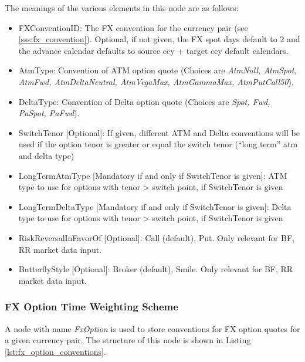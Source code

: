  
The meanings of the various elements in this node are as follows: 
\begin{itemize}
\item FXConventionID: The FX convention for the currency pair (see \ref{sss:fx_convention}). Optional, if not given, the
  FX spot days default to $2$ and the advance calendar defaults to source ccy + target ccy default calendars.
\item AtmType: Convention of ATM option quote (Choices are {\em AtmNull, AtmSpot, AtmFwd, 
AtmDeltaNeutral, AtmVegaMax, AtmGammaMax, AtmPutCall50}). 
\item DeltaType: Convention of Delta option quote (Choices are {\em Spot, Fwd, PaSpot, 
    PaFwd}).
\item SwitchTenor [Optional]: If given, different ATM and Delta conventions will be used if the option tenor is greater
  or equal the switch tenor (``long term'' atm and delta type)
\item LongTermAtmType [Mandatory if and only if SwitchTenor is given]: ATM type to use for options with tenor > switch
  point, if SwitchTenor is given
\item LongTermDeltaType [Mandatory if and only if SwitchTenor is given]: Delta type to use for options with tenor >
  switch point, if SwitchTenor is given
\item RiskReversalInFavorOf [Optional]: Call (default), Put. Only relevant for BF, RR market data input.
\item ButterflyStyle [Optional]: Broker (default), Smile. Only relevant for BF, RR market data input.
\end{itemize} 

\subsubsection{FX Option Time Weighting Scheme}\label{sss:fx_option_timeweighting}
A node with name \emph{FxOption} is used to store conventions for FX option quotes for a given currency pair. The
structure of this node is shown in Listing \ref{lst:fx_option_conventions}.

